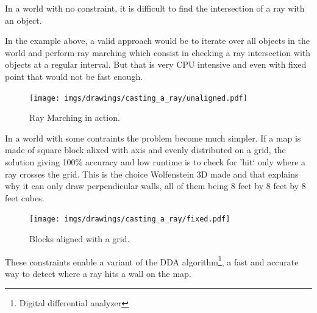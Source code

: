 In a world with no constraint, it is difficult to find the intersection of a ray with an object.\\
\par
In the example above, a valid approach would be to iterate over all objects in the world and perform ray marching which consist in checking a ray intersection with objects at a regular interval. But that is very CPU intensive and even with fixed point that would not be fast enough.
\begin{figure}[H]
\centering
\texttt{[image: imgs/drawings/casting\_a\_ray/unaligned.pdf]}
 \caption{Ray Marching in action.}
\end{figure}


In a world with some contraints the problem become much simpler. If a map is made of square block alixed with axis and evenly distributed on a grid, the solution giving 100\% accuracy and low runtime is to check for 'hit` only where a ray crosses the grid. This is the choice Wolfenstein 3D made and that explains why it can only draw perpendicular walls, all of them being 8 feet by 8 feet by 8 feet cubes.
\begin{figure}[H]
\centering
\texttt{[image: imgs/drawings/casting\_a\_ray/fixed.pdf]}
 \caption{Blocks aligned with a grid.}
\end{figure}
\par
These constraints enable a variant of the DDA algorithm\footnote{Digital differential analyzer}, a fast and accurate way to detect where a ray hits a wall on the map.
\par
